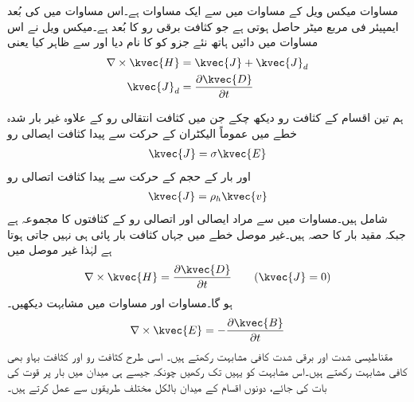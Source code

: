 مساوات  میکس ویل کے مساوات میں سے ایک مساوات ہے۔اس مساوات میں  کی بُعد ایمپیئر فی مربع میٹر حاصل ہوتی ہے جو کثافت برقی رو کا بُعد ہے۔میکس ویل نے اس مساوات میں دائیں ہاتھ نئے جزو  کو  کا نام دیا اور  سے ظاہر کیا یعنی
\begin{gather}
\begin{aligned}\label{مساوات-میکس_ویل_دوسری_مساوات_نقطہ_شکل_ب}
\nabla \times \kvec{H}&=\kvec{J}+\kvec{J}_d\\
\kvec{J}_d&=\frac{\partial \kvec{D}}{\partial t}
\end{aligned}
\end{gather}

ہم تین اقسام کے کثافت رو دیکھ چکے جن میں کثافت انتقالی رو کے علاوہ  غیر بار شدہ خطے میں عموماً الیکٹران کے حرکت سے پیدا  کثافت ایصالی رو
\begin{align}
\kvec{J}=\sigma \kvec{E}
\end{align}
اور بار کے حجم کے حرکت سے پیدا کثافت اتصالی رو
\begin{align}
\kvec{J}=\rho_h \kvec{v}
\end{align}
شامل ہیں۔مساوات  میں  سے مراد ایصالی اور اتصالی رو کے کثافتوں کا مجموعہ ہے جبکہ مقید بار  کا حصہ ہیں۔غیر موصل خطے میں جہاں کثافت بار پائی ہی نہیں جاتی  ہوتا ہے لہٰذا غیر موصل میں
\begin{align}\label{مساوات_میکس_ویل_مقناطیسی_شدت_گردش}
\nabla \times \kvec{H}=\frac{\partial \kvec{D}}{\partial t}  \quad \quad (\kvec{J}=0)
\end{align}
ہو گا۔مساوات  اور مساوات  میں مشابہت دیکھیں۔
\begin{align*}
\nabla \times \kvec{E}=-\frac{\partial \kvec{B}}{\partial t}
\end{align*} 
مقناطیسی شدت  اور برقی شدت  کافی مشابہت رکھتے ہیں۔ اسی طرح کثافت رو  اور کثافت بہاو  بھی کافی مشابہت رکھتے ہیں۔اس مشابہت کو یہیں تک رکھیں چونکہ جیسے ہی میدان میں بار پر قوت کی بات کی جائے، دونوں اقسام کے میدان بالکل مختلف طریقوں سے  عمل کرتے ہیں۔

